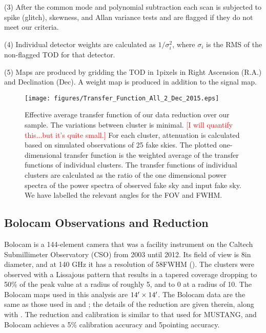 \documentclass[iop,numberedappendix,apj]{emulateapj}
\begin{document}
  (3) After the common mode and polynomial subtraction each scan is subjected to spike (glitch), skewness, and Allan 
  variance tests and are flagged if they do not meet our criteria.

  (4) Individual detector weights are calculated as $1/ \sigma_i^2$, where $\sigma_i$ is the RMS of the non-flagged
  TOD for that detector. 

  (5) Maps are produced by gridding the TOD in 1\asec pixels in Right Ascension (R.A.) and Declination (Dec). A weight 
  map is produced in addition to the signal map.



\begin{figure}
  \begin{center}
  \texttt{[image: figures/Transfer\_Function\_All\_2\_Dec\_2015.eps]}
  \end{center}
  \caption{Effective average transfer function of our data reduction over our sample. 
    The variations between cluster is minimal. \textcolor{red}{[I
        will quantify this...but it's quite small.]} For each cluster, attenuation is
    calculated based on simulated observations of 25 fake skies. The plotted one-dimensional
    transfer function is the weighted average of the transfer functions
    of individual clusters. The transfer functions of individual clusters are calculated as
    the ratio of the one dimensional power spectra of the power spectra of observed fake sky
    and input fake sky. We have labelled the relevant angles for the FOV and FWHM.}
  \label{fig:xfer_all}
\end{figure}


\subsection{Bolocam Observations and Reduction}
\label{sec:bolocamredox}

Bolocam is a 144-element camera that was a facility instrument on the Caltech Submillimeter Observatory (CSO) from
2003 until 2012. Its field of view is 8\amins in diameter, and at 140 GHz it has a resolution of 58\asec FWHM
(\citet{glenn1998,haig2004}). The clusters were observed with a Lissajous pattern that results in a tapered
coverage dropping to 50\% of the peak value at a radius of roughly 5\amin, and to 0 at a radius of 10\amin.
The Bolocam maps used in this analysis are $14\arcmin \times 14\arcmin$. The Bolocam data are the same as those 
used in \citet{czakon2014} and \citet{sayers2013}; the details of the reduction are given therein, along with \citet{sayers2011}. 
The reduction and calibration is similar to that used for MUSTANG, and Bolocam achieves a 
5\% calibration accuracy and 5\asecs pointing accuracy.
\end{document}
